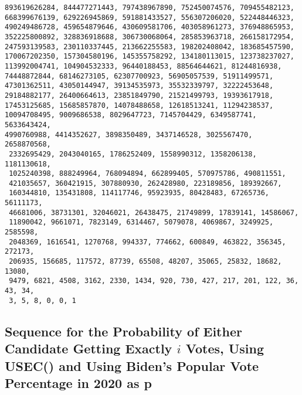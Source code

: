 \documentclass[12pt]{article}
\begin{document}
\begin{verbatim}
893619626284, 844477271443, 797438967890, 752450074576, 709455482123, 
668399676139, 629226945869, 591881433527, 556307206020, 522448446323, 
490249486728, 459654879646, 430609581706, 403058961273, 376948865953, 
352225800892, 328836918688, 306730068064, 285853963718, 266158172954, 
247593139583, 230110337445, 213662255583, 198202408042, 183685457590, 
170067202350, 157304580196, 145355758292, 134180113015, 123738237027, 
113992004741, 104904532333, 96440188453, 88564644621, 81244816938, 
74448872844, 68146273105, 62307700923, 56905057539, 51911499571, 
47301362511, 43050144947, 39134535973, 35532339797, 32222453648, 
29184882177, 26400664613, 23851849790, 21521499793, 19393617918, 
17453125685, 15685857870, 14078488658, 12618513241, 11294238537, 
10094708495, 9009686538, 8029647723, 7145704429, 6349587741, 5633643424, 
4990760988, 4414352627, 3898350489, 3437146528, 3025567470, 2658870568,
 2332695429, 2043040165, 1786252409, 1558990312, 1358206138, 1181130618, 
 1025240398, 888249964, 768094894, 662899405, 570975786, 490811551, 
 421035657, 360421915, 307880930, 262428980, 223189856, 189392667, 
 160344810, 135431808, 114117746, 95923935, 80428483, 67265736, 56111173, 
 46681006, 38731301, 32046021, 26438475, 21749899, 17839141, 14586067, 
 11890042, 9661071, 7823149, 6314467, 5079078, 4069867, 3249925, 2585598, 
 2048369, 1616541, 1270768, 994337, 774662, 600849, 463822, 356345, 272173, 
 206935, 156685, 117572, 87739, 65508, 48207, 35065, 25832, 18682, 13080, 
 9479, 6821, 4508, 3162, 2330, 1434, 920, 730, 427, 217, 201, 122, 36, 43, 34, 
 3, 5, 8, 0, 0, 1
\end{verbatim}

\subsection{Sequence for the Probability of Either Candidate Getting Exactly $i$ Votes, Using USEC() and Using Biden's Popular Vote Percentage in 2020 as p}
\end{document}

